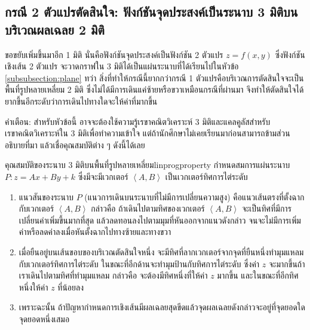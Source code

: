 \subsection{กรณี 2 ตัวแปรตัดสินใจ: ฟังก์ชันจุดประสงค์เป็นระนาบ 3 มิติบนบริเวณผลเฉลย 2 มิติ}
ขอขยับเพิ่มขึ้นมาอีก 1 มิติ นั่นคือฟังก์ชันจุดประสงค์เป็นฟังก์ชัน 2 ตัวแปร $z = f(x,y)$ ซึ่งฟังก์ชันเชิงเส้น 2 ตัวแปร จะวาดกราฟใน 3 มิติได้เป็นแผ่นระนาบที่ได้เรียนไปในหัวข้อ \ref{subsubsection:plane}
ทว่า สิ่งที่ทำให้กรณีนี้ยากกว่ากรณี 1 ตัวแปรคือบริเวณการตัดสินใจจะเป็นพื้นที่รูปหลายเหลี่ยม 2 มิติ ซึ่งไม่ได้มีการเดินแค่ซ้ายหรือขวาเหมือนกรณีที่ผ่านมา จึงทำให้ตัดสินใจได้ยากขึ้นอีกระดับว่าการเดินไปทางใดจะให้ค่าที่มากขึ้น

คำเตือน: สำหรับหัวข้อนี้ อาจจะต้องใช้ความรู้เรขาคณิตวิเคราะห์ 3 มิติและแคลคูลัสสำหรับเรขาคณิตวิเคราะห์ใน 3 มิติเพื่อทำความเข้าใจ แต่ถ้านักศึกษาไม่เคยเรียนมาก่อนสามารถข้ามส่วนอธิบายที่มา แล้วเชื่อคุณสมบัติต่าง ๆ ดังนี้ได้เลย
\begin{property}{คุณสมบัติของระนาบ 3 มิติบนพื้นที่รูปหลายเหลี่ยม}{linprogproperty}
    กำหนดสมการแผ่นระนาบ $P: z = Ax + By + k$ ซึ่งมีจะมีเวกเตอร์ $\left<A,B\right>$ เป็นเวกเตอร์ทิศการไต่ระดับ
    \begin{enumerate}
        \item แนวสันของระนาบ $P$ (แนวการเดินบนระนาบที่ไม่มีการเปลี่ยนความสูง) คือแนวเส้นตรงที่ตั้งฉากกับเวกเตอร์ $\left<A,B\right>$ กล่าวคือ ถ้าเดินไปตามทิศของเวกเตอร์ $\left<A,B\right>$ จะเป็นทิศที่มีการเปลี่ยนค่าเพิ่มขึ้นมากที่สุด แล้วลดทอนลงไปตามมุมที่หันออกจากแนวดังกล่าว จนจะไม่มีการเพิ่มค่าหรือลดค่าลงเมื่อหันตั้งฉากไปทางซ้ายและทางขวา

        \item เมื่อยืนอยู่บนเส้นขอบของบริเวณตัดสินใจหนึ่ง จะมีทิศที่ลากเวกเตอร์จากจุดที่ยืนหนึ่งทำมุมแหลมกับเวกเตอร์ทิศการไต่ระดับ ในขณะที่อีกด้านจะทำมุมป้านกับทิศการไต่ระดับ ซึ่งค่า $z$ จะมากขึ้นถ้าเราเดินไปตามทิศที่ทำมุมแหลม กล่าวคือ จะต้องมีทิศหนึ่งที่ให้ค่า $z$ มากขึ้น และในขณะที่อีกทิศหนึ่งให้ค่า $z$ ที่น้อยลง

        \item เพราะฉะนั้น ถ้าปัญหากำหนดการเชิงเส้นมีผลเฉลยสุดขีดแล้วจุดผลเฉลยดังกล่าวจะอยู่ที่จุดยอดใดจุดยอดหนึ่งเสมอ
    \end{enumerate}
\end{property}

